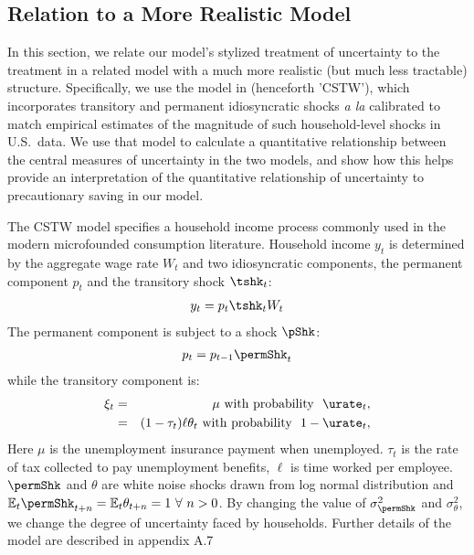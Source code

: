 \documentclass[../../cjSOE.tex]{subfiles}
\begin{document}
\subsection{Relation to a More Realistic Model}\label{subsec:robustness}

In this section, we relate our model's stylized treatment of uncertainty to the treatment in a related model with a much more realistic (but much less tractable) structure. Specifically, we use the model in \cite{cstwMPC} (henceforth 'CSTW'), which incorporates transitory and permanent idiosyncratic shocks {\it a la} \cite{friedmanATheory} calibrated to match empirical estimates of the magnitude of such household-level shocks in U.S.\ data.  We use that model to calculate a quantitative relationship between the central measures of uncertainty in the two models, and show how this helps provide an interpretation of the quantitative relationship of uncertainty to precautionary saving in our model.

The CSTW model specifies a household income process commonly used in the modern microfounded consumption literature.  Household income $y_{t}$ is determined by the aggregate wage rate $W_{t}$ and two idiosyncratic components, the permanent component $p_{t}$ and the transitory shock $\tshk_{t}$:
\begin{align}
  y_{t}=p_{t}\tshk_{t}{W}_{t}
\end{align}
The permanent component is subject to a shock $\pShk$:
\begin{align}
  p_{t}=p_{t-1}\permShk_{t}
\end{align}
while the transitory component is:
\begin{eqnarray}
  \xi_{t} & = & \mu \textrm{ with probability }\ \urate_{t}, %
  \\ & = & (1-\tau_{t})\ell\theta_{t} \textrm{ with probability }\ 1-\urate_{t}, \nonumber
\end{eqnarray}
Here $\mu$ is the unemployment insurance payment when unemployed. $\tau_{t}$ is the rate of tax collected to pay unemployment benefits, $\ell$ is time worked per employee. $\permShk$ and $\theta$ are white noise shocks drawn from log normal distribution and $\mathbb{E}_{t}\permShk_{t+n}=\mathbb{E}_{t}\theta_{t+n}=1~\forall~n>0$. By changing the value of $\sigma^{2}_{\permShk}$ and $\sigma^{2}_{\theta}$, we change the degree of uncertainty faced by households.  Further details of the model are described in appendix A.7
\end{document}
